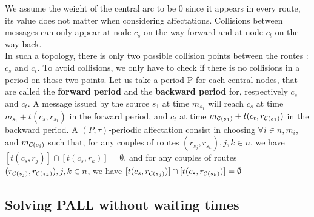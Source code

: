 \documentclass[a4paper,10pt]{article}
\newcommand{\todo}[1]{{\color{red} TODO: {#1}}}
\begin{document}
      We assume the weight of the central arc to be $0$ since it appears in every route,
      its value does not matter when considering affectations. Collisions between messages can 
      only appear at node $c_s$ on the way forward and at node $c_t$ on the way back. \\
      In such a topology, there is only two possible collision points between the routes : $c_s$ and $c_t$. To avoid collisions, we only have to check if there is no collisions in a period on those two points.
      Let us take a period P for each central nodes, that are called the {\bf forward period} and the {\bf backward period} for, respectively $c_s$ and $c_t$. A message issued by the source $s_1$ at time $m_{s_1}$ will reach $c_s$ at time $m_{s_1} + t(c_s,r_{s_1})$ in the forward period, and  $c_t$ at time $m_{{\cal C}(s_1)} + t(c_t,r_{{\cal C}(s_1)})$ in the backward period.
      A $(P,\tau)$-periodic affectation consist in choosing $\forall i \in n, m_i$, and $m_{{\cal C}(s_i)}$ such that, for any couples of routes $(r_{s_j}, r_{s_k}), j,k \in n$,
      we have $[t(c_s,r_j)] \cap [t(c_s,r_k)] = \emptyset$.
      and for any couples of routes $(r_{{\cal C}(s_j)}, r_{{\cal C}(s_k)}), j,k \in n$, we have $[t(c_s,r_{{\cal C}(s_j)})] \cap [t(c_s,r_{{\cal C}(s_k)})] = \emptyset$
%       

      
%       
      

  \subsection{Solving PALL without waiting times}
  
\end{document}
